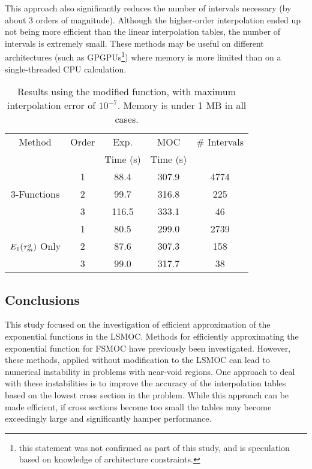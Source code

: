 {{{{        This approach also significantly reduces the number of intervals necessary (by about 3 orders of magnitude).
        Although the higher-order interpolation ended up not being more efficient than the linear interpolation tables, the number of intervals is extremely small.
        These methods may be useful on different architectures (such as \acp{GPGPU}\footnote{this statement was not confirmed as part of this study, and is speculation based on knowledge of architecture constraints.}) where memory is more limited than on a single-threaded \ac{CPU} calculation.

        \begin{table}
          \centering
          \caption{Results using the modified function, with maximum interpolation error of $10^{-7}$. Memory is under 1 MB in all cases.}
          \label{tab:LSMOC:ET:Final Results}
          \begin{tabular}{@{}ccccc@{}}\toprule
            Method & Order & Exp.     & \ac{MOC}& \# Intervals \\
                   &       & Time (s) & Time (s) & \\\midrule
            \multirow{3}{*}{3-Functions}      & 1 &  88.4 & 307.9 & 4774\\
                                              & 2 &  99.7 & 316.8 &  225\\
                                              & 3 & 116.5 & 333.1 &   46\\\midrule
            \multirow{3}{*}{$E_1(\opt)$ Only} & 1 &  80.5 & 299.0 & 2739\\
                                              & 2 &  87.6 & 307.3 &  158\\
                                              & 3 &  99.0 & 317.7 &   38\\\bottomrule
          \end{tabular}
        \end{table}
      }
    }
    \subsection{Conclusions}{\label{ssec:LSMOC:ET:Conclusions}
      This study focused on the investigation of efficient approximation of the exponential functions in the \ac{LSMOC}.
      Methods for efficiently approximating the exponential function for \ac{FSMOC} have previously been investigated.
      However, these methods, applied without modification to the \ac{LSMOC} can lead to numerical instability in problems with near-void regions.
      One approach to deal with these instabilities is to improve the accuracy of the interpolation tables based on the lowest cross section in the problem.
      While this approach can be made efficient, if cross sections become too small the tables may become exceedingly large and significantly hamper performance.

}}}
